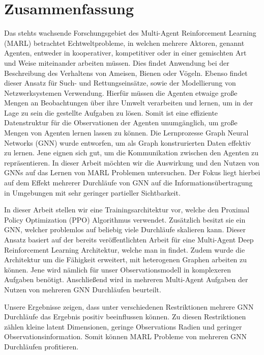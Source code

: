 
\chapter*{Zusammenfassung}

Das stehts wachsende Forschungsgebiet des Multi-Agent Reinforcement Learning (MARL) betrachtet Echtweltprobleme, in welchen mehrere Aktoren, genannt Agenten, entweder in kooperativer, kompetitiver oder in einer gemischten Art und Weise miteinander arbeiten müssen. Dies findet Anwendung bei der Beschreibung des Verhaltens von Ameisen, Bienen oder Vögeln. Ebenso findet dieser Ansatz für Such- und Rettungseinsätze, sowie der Modellierung von Netzwerksystemen Verwendung. Hierfür müssen die Agenten etwaige große Mengen an Beobachtungen über ihre Umwelt verarbeiten und lernen, um in der Lage zu sein die gestellte Aufgaben zu lösen. Somit ist eine effiziente Datenstruktur für die Observationen der Agenten unumgänglich, um große Mengen von Agenten lernen lassen zu können. 
Die Lernprozesse Graph Neural Networks (GNN) wurde entworfen, um als Graph konstrurierten Daten effektiv zu lernen. Jene eignen sich gut, um die Kommunikation zwischen den Agenten zu repräsentieren. In dieser Arbeit möchten wir die Auswirkung und den Nutzen von GNNs auf das Lernen von MARL Problemen untersuchen. Der Fokus liegt hierbei auf dem Effekt mehrerer Durchläufe von GNN auf die Informationsübertragung in Umgebungen mit sehr geringer partieller Sichtbarkeit.\par

In dieser Arbeit stellen wir eine Trainingsarchitektur vor, welche den Proximal Policy Optimization (PPO) Algorithmus verwendet. Zusätzlich besitzt sie ein GNN, welcher problemlos auf beliebig viele Durchläufe skalieren kann. Dieser Ansatz basiert auf der bereits veröffentlichten Arbeit für eine Multi-Agent Deep Reinforcement Learning Architektur, welche man in \citet{RobinRuede2021} findet. Zudem wurde die Architektur um die Fähigkeit erweitert, mit heterogenen Graphen arbeiten zu können. Jene wird nämlich für unser Observationsmodell in komplexeren Aufgaben benötigt. Anschließend wird in mehreren Multi-Agent Aufgaben der Nutzen von mehreren GNN Durchläufen beurteilt.\par

Unsere Ergebnisse zeigen, dass unter verschiedenen Restriktionen mehrere GNN Durchläufe das Ergebnis positiv beeinflussen können. Zu diesen Restriktionen zählen kleine latent Dimensionen, geringe Observations Radien und geringer Observationsinformation. Somit können MARL Probleme von mehreren GNN Durchläufen profitieren.